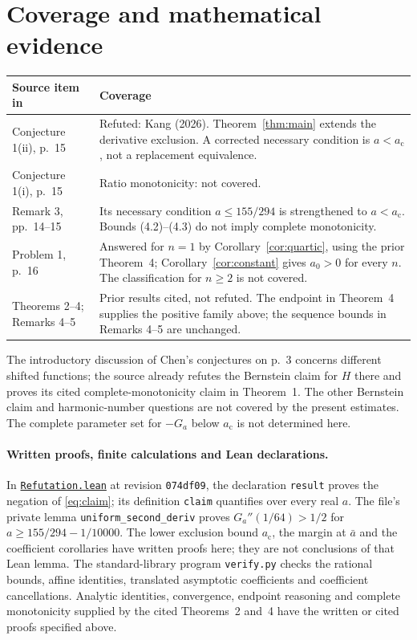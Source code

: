 \documentclass[11pt]{article}
\newcommand{\ac}{a_{\mathrm c}}
\newcommand{\ab}{\bar a}
\begin{document}
\section{Coverage and mathematical evidence}
\noindent
\begin{tabular}{@{}p{.30\linewidth}p{.65\linewidth}@{}}
\toprule
Source item in \cite{ycz} & Coverage\\
\midrule
Conjecture 1(ii), p.~15 & Refuted: Kang (2026). Theorem~\ref{thm:main}
extends the derivative exclusion. A corrected necessary condition is
$a<\ac$, not a replacement equivalence.\\[3pt]
Conjecture 1(i), p.~15 & Ratio monotonicity: not covered.\\[3pt]
Remark 3, pp.~14--15 & Its necessary condition $a\leq155/294$ is
strengthened to $a<\ac$. Bounds (4.2)--(4.3) do not imply complete
monotonicity.\\[3pt]
Problem 1, p.~16 & Answered for $n=1$ by
Corollary~\ref{cor:quartic}, using the prior Theorem~4;
Corollary~\ref{cor:constant} gives $a_0>0$ for every $n$.
The classification for $n\geq2$ is not covered.\\[3pt]
Theorems 2--4; Remarks 4--5 & Prior results cited, not refuted.
The endpoint in Theorem~4 supplies the positive family above;
the sequence bounds in Remarks 4--5 are unchanged.\\
\bottomrule
\end{tabular}

\medskip
The introductory discussion of Chen's conjectures on p.~3 concerns
different shifted functions; the source already refutes the Bernstein
claim for $H$ there and proves its cited complete-monotonicity claim
in Theorem~1. The other Bernstein claim and harmonic-number questions
are not covered by the present estimates.
The complete parameter set for $-G_a$ below $\ac$ is not determined here.

\paragraph{Written proofs, finite calculations and Lean declarations.}
In
\href{https://github.com/the-omega-institute/trureturing/blob/074df09ddbbef1843ddb383577bfaa827f753e36/D5/S3/Analytic/YangChuZhangPsiCM/Refutation.lean}{\texttt{Refutation.lean}}
at revision \texttt{074df09}, the declaration \texttt{result} proves the
negation of \eqref{eq:claim}; its definition \texttt{claim} quantifies
over every real $a$. The file's private lemma
\texttt{uniform\_\allowbreak second\_\allowbreak deriv} proves
$G_a''(1/64)>1/2$ for $a\geq155/294-1/10000$.
The lower exclusion bound $\ac$, the margin at $\ab$ and the coefficient
corollaries have written proofs here; they are not conclusions of that
Lean lemma. The standard-library program \texttt{verify.py} checks
the rational bounds, affine identities, translated asymptotic coefficients
and coefficient cancellations. Analytic identities, convergence,
endpoint reasoning and complete monotonicity supplied by the cited
Theorems~2 and~4 have the written or cited proofs specified above.
\end{document}
